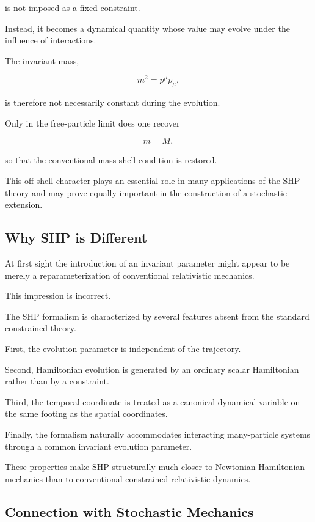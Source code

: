 is not imposed as a fixed constraint.

Instead, it becomes a dynamical quantity whose value may evolve under the
influence of interactions.

The invariant mass,

\[
m^2
=
p^\mu p_\mu ,
\]

is therefore not necessarily constant during the evolution.

Only in the free-particle limit does one recover

\[
m=M,
\]

so that the conventional mass-shell condition is restored.

This off-shell character plays an essential role in many applications of
the SHP theory and may prove equally important in the construction of a
stochastic extension.

\subsection{Why SHP is Different}

At first sight the introduction of an invariant parameter might appear to
be merely a reparameterization of conventional relativistic mechanics.

This impression is incorrect.

The SHP formalism is characterized by several features absent from the
standard constrained theory.

First, the evolution parameter is independent of the trajectory.

Second, Hamiltonian evolution is generated by an ordinary scalar
Hamiltonian rather than by a constraint.

Third, the temporal coordinate is treated as a canonical dynamical
variable on the same footing as the spatial coordinates.

Finally, the formalism naturally accommodates interacting many-particle
systems through a common invariant evolution parameter.

These properties make SHP structurally much closer to Newtonian
Hamiltonian mechanics than to conventional constrained relativistic
dynamics.

\subsection{Connection with Stochastic Mechanics}

